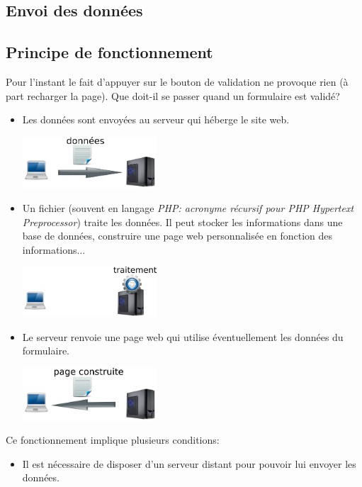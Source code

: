 \documentclass[a4paper,11pt]{article}
\begin{document}
\begin{Form}
\section{Envoi des données}
\subsection{Principe de fonctionnement}
Pour l'instant le fait d'appuyer sur le bouton de validation ne provoque rien (à part recharger la page). Que doit-il se passer quand un formulaire est validé?
\begin{itemize}
\item Les données sont envoyées au serveur qui héberge le site web.
\begin{center}
\includegraphics[width=5cm]{ressources/form1.png}
\end{center}
\item Un fichier (souvent en langage \emph{PHP: acronyme récursif pour PHP Hypertext Preprocessor}) traite les données. Il peut stocker les informations dans une base de données, construire une page web personnalisée en fonction des informations...
\begin{center}
\includegraphics[width=5cm]{ressources/form2.png}
\end{center}
\item Le serveur renvoie une page web qui utilise éventuellement les données du formulaire.
\begin{center}
\includegraphics[width=5cm]{ressources/form3.png}
\end{center}
\end{itemize}
Ce fonctionnement implique plusieurs conditions:
\begin{itemize}
\item Il est nécessaire de disposer d'un serveur distant pour pouvoir lui envoyer les données.

\end{itemize}
\end{Form}
\end{document}
